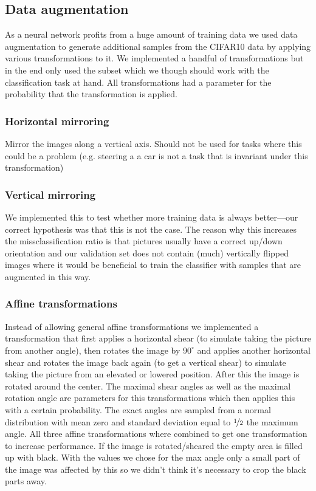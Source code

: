 \subsection{Data augmentation}
As a neural network profits from a huge amount of training data we used data augmentation to generate additional samples from the CIFAR10 data by applying various transformations to it. We implemented a handful of transformations but in the end only used the subset which we though should work with the classification task at hand. All transformations had a parameter  for the probability that the transformation is applied. 
\subsubsection{Horizontal mirroring} Mirror the images along a vertical axis. Should not be used for tasks where this could be a problem (e.g. steering a a car is not a task that is invariant under this transformation)
\subsubsection{Vertical mirroring} We implemented this to test whether more training data is always better---our correct hypothesis was that this is not the case. The reason why this increases the missclassification ratio is that pictures usually have a correct up/down orientation and our validation set does not contain (much) vertically flipped images where it would be beneficial to train the classifier with samples that are augmented in this way. 
\subsubsection{Affine transformations} Instead of allowing general affine transformations we implemented a transformation that first applies a horizontal shear (to simulate taking the picture from another angle), then rotates the image by $90^\circ$ and applies another horizontal shear and rotates the image back again (to get a vertical shear) to simulate taking the picture from an elevated or lowered position. After this the image is rotated around the center. The maximal shear angles as well as the maximal rotation angle are parameters for this transformations which then applies this with a certain probability. The exact angles are sampled from a normal distribution with mean zero and standard deviation equal to $\nicefrac 1 2$ the maximum angle. All three affine transformations where combined to get one transformation to increase performance. If the image is rotated/sheared the empty area is filled up with black. With the values we chose for the max angle only a small part of the image was affected by this so we didn't think it's necessary to crop the black parts away.
